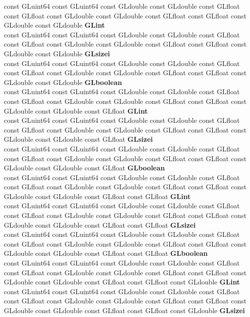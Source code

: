 \begin{DoxyCompactItemize}
\begin{tabbing}
\>const GLuint64 const GLuint64 const GLdouble const GLdouble const GLfloat const GLfloat const GLdouble const GLdouble const GLfloat const GLfloat const GLdouble const GLdouble {\bfseries GLint}\\
\>const GLuint64 const GLuint64 const GLdouble const GLdouble const GLfloat const GLfloat const GLdouble const GLdouble const GLfloat const GLfloat const GLdouble const GLdouble {\bfseries GLsizei}\\
\>const GLuint64 const GLuint64 const GLdouble const GLdouble const GLfloat const GLfloat const GLdouble const GLdouble const GLfloat const GLfloat const GLdouble const GLdouble {\bfseries GLboolean}\\
\>const GLuint64 const GLuint64 const GLdouble const GLdouble const GLfloat const GLfloat const GLdouble const GLdouble const GLfloat const GLfloat const GLdouble const GLdouble const GLfloat {\bfseries GLint}\\
\>const GLuint64 const GLuint64 const GLdouble const GLdouble const GLfloat const GLfloat const GLdouble const GLdouble const GLfloat const GLfloat const GLdouble const GLdouble const GLfloat {\bfseries GLsizei}\\
\>const GLuint64 const GLuint64 const GLdouble const GLdouble const GLfloat const GLfloat const GLdouble const GLdouble const GLfloat const GLfloat const GLdouble const GLdouble const GLfloat {\bfseries GLboolean}\\
\>const GLuint64 const GLuint64 const GLdouble const GLdouble const GLfloat const GLfloat const GLdouble const GLdouble const GLfloat const GLfloat const GLdouble const GLdouble const GLfloat const GLfloat {\bfseries GLint}\\
\>const GLuint64 const GLuint64 const GLdouble const GLdouble const GLfloat const GLfloat const GLdouble const GLdouble const GLfloat const GLfloat const GLdouble const GLdouble const GLfloat const GLfloat {\bfseries GLsizei}\\
\>const GLuint64 const GLuint64 const GLdouble const GLdouble const GLfloat const GLfloat const GLdouble const GLdouble const GLfloat const GLfloat const GLdouble const GLdouble const GLfloat const GLfloat {\bfseries GLboolean}\\
\>const GLuint64 const GLuint64 const GLdouble const GLdouble const GLfloat const GLfloat const GLdouble const GLdouble const GLfloat const GLfloat const GLdouble const GLdouble const GLfloat const GLfloat const GLdouble {\bfseries GLint}\\
\>const GLuint64 const GLuint64 const GLdouble const GLdouble const GLfloat const GLfloat const GLdouble const GLdouble const GLfloat const GLfloat const GLdouble const GLdouble const GLfloat const GLfloat const GLdouble {\bfseries GLsizei}\\

\end{tabbing}
\end{DoxyCompactItemize}
